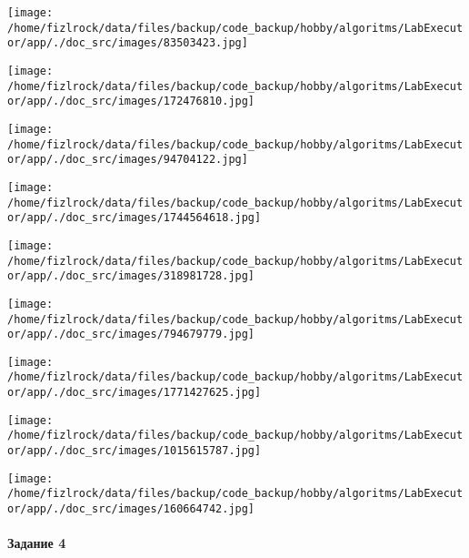 \documentclass[a4paper, 12pt]{article}
\begin{document}
\texttt{[image: /home/fizlrock/data/files/backup/code\_backup/hobby/algoritms/LabExecutor/app/./doc\_src/images/83503423.jpg]}

\texttt{[image: /home/fizlrock/data/files/backup/code\_backup/hobby/algoritms/LabExecutor/app/./doc\_src/images/172476810.jpg]}

\texttt{[image: /home/fizlrock/data/files/backup/code\_backup/hobby/algoritms/LabExecutor/app/./doc\_src/images/94704122.jpg]}

\texttt{[image: /home/fizlrock/data/files/backup/code\_backup/hobby/algoritms/LabExecutor/app/./doc\_src/images/1744564618.jpg]}

\texttt{[image: /home/fizlrock/data/files/backup/code\_backup/hobby/algoritms/LabExecutor/app/./doc\_src/images/318981728.jpg]}

\texttt{[image: /home/fizlrock/data/files/backup/code\_backup/hobby/algoritms/LabExecutor/app/./doc\_src/images/794679779.jpg]}

\texttt{[image: /home/fizlrock/data/files/backup/code\_backup/hobby/algoritms/LabExecutor/app/./doc\_src/images/1771427625.jpg]}

\texttt{[image: /home/fizlrock/data/files/backup/code\_backup/hobby/algoritms/LabExecutor/app/./doc\_src/images/1015615787.jpg]}

\texttt{[image: /home/fizlrock/data/files/backup/code\_backup/hobby/algoritms/LabExecutor/app/./doc\_src/images/160664742.jpg]}
\pagebreak
\paragraph{Задание 4}
\end{document}
